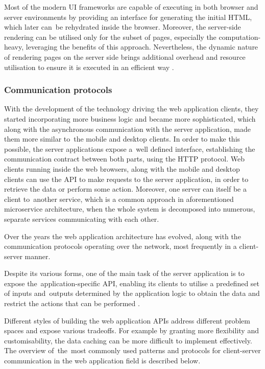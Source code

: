 Most of the modern UI frameworks are capable of executing in both browser and server environments by providing an interface for generating the initial HTML, which later can~be rehydrated inside the browser. Moreover, the server-side rendering can be utilised only for the subset of pages, especially the computation-heavy, leveraging the benefits of this approach. Nevertheless, the dynamic nature of rendering pages on the server side brings additional overhead and resource utilisation to ensure it is executed in an efficient way \cite{GoogleRenderingOnTheWeb}.

\subsubsection{Communication protocols} \label{chapter:communication-protocols}

With the development of the technology driving the web application clients, they started incorporating more business logic and became more sophisticated, which along with the asynchronous communication with the server application, made them more similar to~the mobile and desktop clients. In order to make this possible, the server applications expose a~well defined interface, establishing the communication contract between both parts, using the HTTP protocol. Web clients running inside the web browsers, along with the mobile and desktop clients can use the API to make requests to the server application, in order to retrieve the data or perform some action. Moreover, one server can itself be a client to~another service, which is a common approach in aforementioned microservice architecture, when the whole system is decomposed into numerous, separate services communicating with each other.

Over the years the web application architecture has evolved, along with the communication protocols operating over the network, most frequently in a client-server manner. 

Despite its various forms, one of the main task of the server application is to expose the~application-specific API, enabling its clients to utilise a predefined set of inputs and~outputs determined by the application logic to obtain the data and restrict the actions that can be performed \cite{DesignDataIntensiveApplications}.

Different styles of building the web application APIs address different problem spaces and expose various tradeoffs. For example by granting more flexibility and customisability, the data caching can be more difficult to implement effectively.
The overview of~the~most commonly used patterns and protocols for client-server communication in the web application field is described below.

